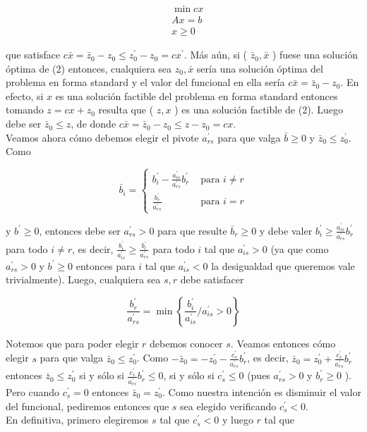 \documentclass[10pt]{article}
\begin{document}
$$
\begin{aligned}
& \min c x \\
& A x=b \\
& x \geq 0
\end{aligned}
$$

que satisface $c \bar{x}=\bar{z}_{0}-z_{0} \leq z_{0}^{\prime}-z_{0}=c x^{\prime}$. Más aún, si ( $\bar{z}_{0}, \bar{x}$ ) fuese una solución óptima de (2) entonces, cualquiera sea $z_{0}, \bar{x}$ sería una solución óptima del problema en forma standard y el valor del funcional en ella sería $c \bar{x}=\bar{z}_{0}-z_{0}$. En efecto, si $x$ es una solución factible del problema en forma standard entonces tomando $z=c x+z_{0}$ resulta que ( $z, x$ ) es una solución factible de (2). Luego debe ser $\bar{z}_{0} \leq z$, de donde $c \bar{x}=\bar{z}_{0}-z_{0} \leq z-z_{0}=c x$.\\
Veamos ahora cómo debemos elegir el pivote $a_{r s}^{\prime}$ para que valga $\bar{b} \geq 0$ y $\bar{z}_{0} \leq z_{0}^{\prime}$. Como

$$
\bar{b}_{i}= \begin{cases}b_{i}^{\prime}-\frac{a_{i s}^{\prime}}{a_{r s}^{\prime}} b_{r}^{\prime} & \text { para } i \neq r \\ \frac{b_{r}^{\prime}}{a_{r s}^{\prime}} & \text { para } i=r\end{cases}
$$

y $b^{\prime} \geq 0$, entonces debe ser $a_{r s}^{\prime}>0$ para que resulte $\bar{b}_{r} \geq 0$ y debe valer $b_{i}^{\prime} \geq \frac{a_{i s}^{\prime}}{a_{r s}^{\prime}} b_{r}^{\prime}$ para todo $i \neq r$, es decir, $\frac{b_{i}^{\prime}}{a_{i s}^{\prime}} \geq \frac{b_{r}^{\prime}}{a_{r s}^{\prime}}$ para todo $i$ tal que $a_{i s}^{\prime}>0$ (ya que como $a_{r s}^{\prime}>0$ y $b^{\prime} \geq 0$ entonces para $i$ tal que $a_{i s}^{\prime}<0$ la desigualdad que queremos vale trivialmente). Luego, cualquiera sea $s, r$ debe satisfacer

$$
\frac{b_{r}^{\prime}}{a_{r s}^{\prime}}=\min \left\{\frac{b_{i}^{\prime}}{a_{i s}^{\prime}} / a_{i s}^{\prime}>0\right\}
$$

Notemos que para poder elegir $r$ debemos conocer $s$. Veamos entonces cómo elegir $s$ para que valga $\bar{z}_{0} \leq z_{0}^{\prime}$. Como $-\bar{z}_{0}=-z_{0}^{\prime}-\frac{c_{s}^{\prime}}{a_{r s}^{\prime}} b_{r}^{\prime}$, es decir, $\bar{z}_{0}=z_{0}^{\prime}+\frac{c_{s}^{\prime}}{a_{r s}^{\prime}} b_{r}^{\prime}$ entonces $\bar{z}_{0} \leq z_{0}^{\prime}$ si y sólo si $\frac{c_{s}^{\prime}}{a_{r s}^{\prime}} b_{r}^{\prime} \leq 0$, si y sólo si $c_{s}^{\prime} \leq 0$ (pues $a_{r s}^{\prime}>0$ y $b_{r}^{\prime} \geq 0$ ). Pero cuando $c_{s}^{\prime}=0$ entonces $\bar{z}_{0}=z_{0}^{\prime}$. Como nuestra intención es disminuir el valor del funcional, pediremos entonces que $s$ sea elegido verificando $c_{s}^{\prime}<0$.\\
En definitiva, primero elegiremos $s$ tal que $c_{s}^{\prime}<0$ y luego $r$ tal que
\end{document}
